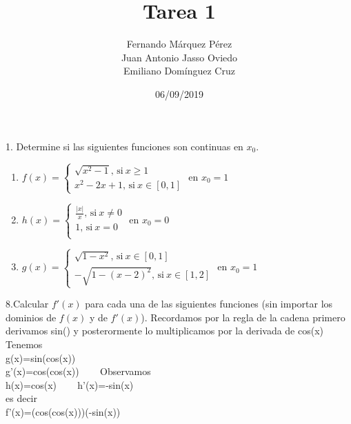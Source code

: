 \documentclass[12pt]{article}
\title{Tarea 1}
\author{Fernando Márquez Pérez \\ Juan Antonio Jasso Oviedo \\ Emiliano Dom\'inguez Cruz}
\date{06/09/2019}
\affil{Facultad de Ciencias\\UNAM}
\begin{document}
\begin{titlepage}
    \maketitle
\end{titlepage}

1. Determine si las siguientes funciones son continuas en \(x_0\).

\begin{enumerate}[\hspace{12px} a)]
    \item
    \( f(x)=
    \begin{cases}
        \sqrt{x^2-1}\text{, si} \ x \geq 1\\
        x^2-2x+1\text{, si} \ x \in [0,1]
    \end{cases}
    \)
    en $x_0 = 1$\\
    \item
    \( h(x)=
    \begin{cases}
        \frac{|x|}{x}\text{, si} \ x \neq 0\\
        1\text{, si} \ x=0\\
    \end{cases}
    \)
    en $x_0=0$
    \item
    \( g(x)=
    \begin{cases}
        \sqrt{1-x^2}\text{, si} \ x \in [0,1]\\
        -\sqrt{1-(x-2)^2}\text{, si} \ x \in [1,2]
    \end{cases}
    \)
    en $x_0=1$
\end{enumerate}

\vfill

8.Calcular $f'(x)$ para cada una de las siguientes funciones (sin importar los dominios de $f(x)$ y de $f'(x)$).
        Recordamos por la regla de la cadena primero derivamos sin() y posterormente lo multiplicamos por la derivada de cos(x)\\
        Tenemos\\
        g(x)=sin(cos(x))\\
        g'(x)=cos(cos(x)) \ \ \  %
        Observamos\\
        h(x)=cos(x)  \ \ \ %
        h'(x)=-sin(x)\\
        es decir\\
        f'(x)=(cos(cos(x)))(-sin(x)) \ \ \ %
\end{document}

